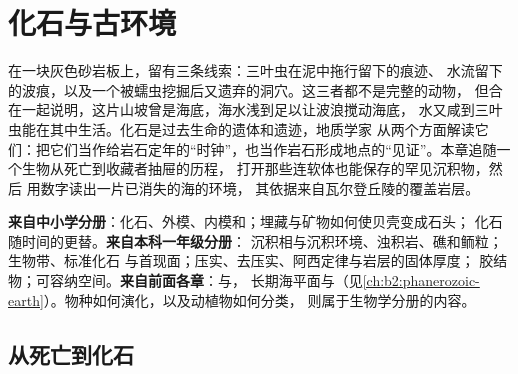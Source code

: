 \chapter{化石与古环境}\label{ch:b2:palaeoenvironments}

在一块灰色砂岩板上，留有三条线索：三叶虫在泥中拖行留下的痕迹、
水流留下的波痕，以及一个被蠕虫挖掘后又遗弃的洞穴。这三者都不是完整的动物，
但合在一起说明，这片山坡曾是海底，海水浅到足以让波浪搅动海底，
水又咸到三叶虫能在其中生活。化石是过去生命的遗体和遗迹，地质学家
从两个方面解读它们：把它们当作给岩石定年的“时钟”，也当作岩石形成地点的“见证”。本章追随一个生物从死亡到收藏者抽屉的历程，
打开那些连软体也能保存的罕见沉积物，然后
用数字读出一片已消失的海的环境，
其依据来自瓦尔登丘陵的覆盖岩层。

\begin{recall}
\textbf{来自中小学分册}：化石、外模、内模和；埋藏与矿物如何使贝壳变成石头；
化石随时间的更替。\textbf{来自本科一年级分册}：
沉积相与沉积环境、浊积岩、礁和鲕粒；生物带、标准化石
与首现面；压实、去压实、阿西定律与岩层的固体厚度；
胶结物；可容纳空间。\textbf{来自前面各章}：与，
长期海平面与（见\cref{ch:b2:phanerozoic-earth}）。物种如何演化，以及动植物如何分类，
则属于生物学分册的内容。
\end{recall}

\section{从死亡到化石}\label{sec:b2:palaeoenvironments:taphonomy}

